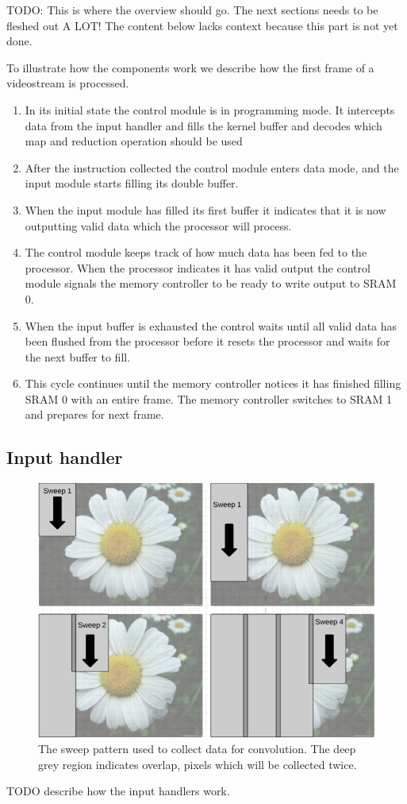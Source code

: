 TODO: This is where the overview should go. The next sections needs to be fleshed out A LOT!
The content below lacks context because this part is not yet done.

To illustrate how the components work we describe how the first frame of a videostream is processed.
\begin{enumerate}

    \item In its initial state the control module is in programming mode. It intercepts data from the input handler and fills the kernel buffer and decodes which map and reduction operation should be used
    \item After the instruction collected the control module enters data mode, and the input module starts filling its double buffer.
    \item When the input module has filled its first buffer it indicates that it is now outputting valid data which the processor will process.
    \item The control module keeps track of how much data has been fed to the processor. When the processor indicates it has valid output the control module signals the memory controller to be ready to write output to SRAM 0.
    \item When the input buffer is exhausted the control waits until all valid data has been flushed from the processor before it resets the processor and waits for the next buffer to fill.
    \item This cycle continues until the memory controller notices it has finished filling SRAM 0 with an entire frame. The memory controller switches to SRAM 1 and prepares for next frame.
\end{enumerate}

\subsection{Input handler}
\begin{figure}[h!]
    \includegraphics[width=\linewidth]{img/Sweeps.png}
    \caption{The sweep pattern used to collect data for convolution. The deep grey region indicates overlap, pixels which will be collected twice.}
    \label{fig:Sweeps}
\end{figure}
TODO describe how the input handlers work.

